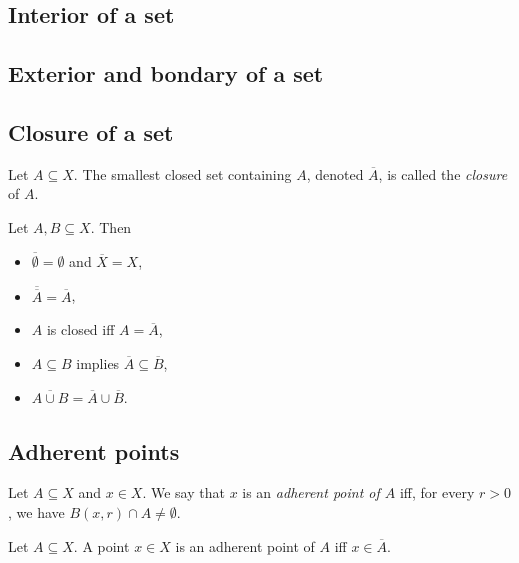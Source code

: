 \documentclass{article}
\begin{document}
\subsection{Interior of a set}

\subsection{Exterior and bondary of a set}

\subsection{Closure of a set}

\begin{definition}
    Let $A\subseteq X$. The smallest closed set containing $A$, denoted $\overline A$, is called
    the \emph{closure} of $A$.
\end{definition}

\begin{proposition}[Notes 4.26]
    Let $A,B\subseteq X$. Then
    \begin{itemize}
        \item $\overline\emptyset = \emptyset$ and $\overline X = X$,
        \item $\overline{\overline A} = \overline A$,
        \item $A$ is closed iff $A=\overline A$,
        \item $A\subseteq B$ implies $\overline A\subseteq\overline B$,
        \item $\overline{A\cup B} = \overline A \cup \overline B$.
    \end{itemize}
\end{proposition}

\subsection{Adherent points}

\begin{definition}[Notes 4.27]
    Let $A\subseteq X$ and $x\in X$. We say that $x$ is an \emph{adherent point of $A$}
    iff, for every $r>0$, we have $B(x,r)\cap A\not=\emptyset$.
\end{definition}

\begin{proposition}[Notes 4.29]
    Let $A\subseteq X$. A point $x\in X$ is an adherent point of $A$ iff
    $x\in\overline A$.
\end{proposition}
\end{document}
